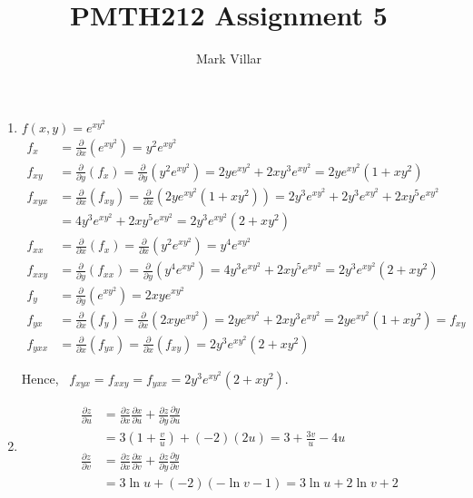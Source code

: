 \documentclass[12pt]{amsart}
\title{PMTH212 Assignment 5}
\author{Mark Villar}
\begin{document}
 

\maketitle 

\begin{enumerate}
	
	\item $f(x,y)=e^{xy^2}$
		\begin{align*}
			f_x&=\frac{\partial}{\partial x}(e^{xy^2})= y^2e^{xy^2} \\
			f_{xy}&=\frac{\partial}{\partial y}(f_x)=\frac{\partial}{\partial y}(y^2e^{xy^2})=2ye^{xy^2}+2xy^3e^{xy^2}=2ye^{xy^2}(1+xy^2)\\
			f_{xyx}&=\frac{\partial}{\partial x}(f_{xy})=\frac{\partial}{\partial x}(2ye^{xy^2}(1+xy^2))=2y^3e^{xy^2}+2y^3e^{xy^2}+2xy^5e^{xy^2} \\
			&=4y^3e^{xy^2}+2xy^5e^{xy^2}=2y^3e^{xy^2}(2+xy^2) \\
			f_{xx}&=\frac{\partial}{\partial x}(f_x)=\frac{\partial}{\partial x}(y^2e^{xy^2})=y^4e^{xy^2}\\
			f_{xxy}&=\frac{\partial}{\partial y}(f_{xx})=\frac{\partial}{\partial y}(y^4e^{xy^2})=4y^3e^{xy^2}+2xy^5e^{xy^2}=2y^3e^{xy^2}(2+xy^2) \\
			f_y&=\frac{\partial}{\partial y}(e^{xy^2})= 2xye^{xy^2} \\
			f_{yx}&=\frac{\partial}{\partial x}(f_y)=\frac{\partial}{\partial x}(2xye^{xy^2})=2ye^{xy^2}+2xy^3e^{xy^2}=2ye^{xy^2}(1+xy^2)=f_{xy} \\
			f_{yxx}&=\frac{\partial}{\partial x}(f_{yx})=\frac{\partial}{\partial x}(f_{xy})=2y^3e^{xy^2}(2+xy^2)
		\end{align*}
		
	Hence, \ $f_{xyx}=f_{xxy}=f_{yxx}=2y^3e^{xy^2}(2+xy^2)$.
		
	\item
		\begin{align*}
			\frac{\partial z}{\partial u}&=\frac{\partial z}{\partial x} \frac{\partial x}{\partial u}+\frac{\partial z}{\partial y} \frac{\partial y}{\partial u} \\
			&=3\left(1+\frac{v}{u}\right)+(-2)(2u)=3+\frac{3v}{u}-4u \\
			\frac{\partial z}{\partial v}&=\frac{\partial z}{\partial x} \frac{\partial x}{\partial v}+\frac{\partial z}{\partial y} \frac{\partial y}{\partial v} \\
			&=3\ln u+(-2)(-\ln v-1)=3\ln u+2 \ln v +2
		\end{align*}
							

\end{enumerate}
\end{document}
